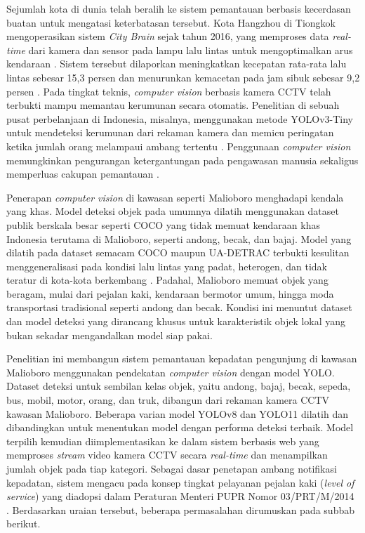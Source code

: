 Sejumlah kota di dunia telah beralih ke sistem pemantauan berbasis kecerdasan buatan 
untuk mengatasi keterbatasan tersebut. Kota Hangzhou di Tiongkok mengoperasikan sistem 
\textit{City Brain} sejak tahun 2016, yang memproses data \textit{real-time} dari kamera dan 
sensor pada lampu lalu lintas untuk mengoptimalkan arus kendaraan 
\cite{caprotti2022platform}. Sistem tersebut dilaporkan meningkatkan kecepatan rata-rata 
lalu lintas sebesar 15,3 persen dan menurunkan kemacetan pada jam sibuk sebesar 9,2 
persen \cite{caprotti2022platform}. Pada tingkat teknis, \textit{computer vision} 
berbasis kamera CCTV telah terbukti mampu memantau kerumunan secara otomatis. 
Penelitian di sebuah pusat perbelanjaan di Indonesia, misalnya, menggunakan metode 
YOLOv3-Tiny untuk mendeteksi kerumunan dari rekaman kamera dan memicu peringatan ketika 
jumlah orang melampaui ambang tertentu \cite{ginting2021crowd}. Penggunaan 
\textit{computer vision} memungkinkan pengurangan ketergantungan pada pengawasan manusia 
sekaligus memperluas cakupan pemantauan \cite{khan2020crowd}.

Penerapan \textit{computer vision} di kawasan seperti Malioboro menghadapi kendala yang 
khas. Model deteksi objek pada umumnya dilatih menggunakan dataset publik berskala besar 
seperti COCO yang tidak memuat kendaraan khas Indonesia terutama di Malioboro, seperti 
andong, becak, dan bajaj. Model yang dilatih pada dataset semacam COCO maupun UA-DETRAC 
terbukti kesulitan menggeneralisasi pada kondisi lalu lintas yang padat, heterogen, dan 
tidak teratur di kota-kota berkembang \cite{sharma2025bmd}. Padahal, Malioboro memuat 
objek yang beragam, mulai dari pejalan kaki, kendaraan bermotor umum, hingga moda 
transportasi tradisional seperti andong dan becak. Kondisi ini menuntut dataset dan model 
deteksi yang dirancang khusus untuk karakteristik objek lokal yang bukan sekadar 
mengandalkan model siap pakai.

Penelitian ini membangun sistem pemantauan kepadatan pengunjung di kawasan Malioboro 
menggunakan pendekatan \textit{computer vision} dengan model YOLO. Dataset deteksi untuk 
sembilan kelas objek, yaitu andong, bajaj, becak, sepeda, bus, mobil, motor, orang, dan 
truk, dibangun dari rekaman kamera CCTV kawasan Malioboro. Beberapa varian model 
YOLOv8 dan YOLO11 dilatih dan dibandingkan untuk menentukan model dengan performa deteksi 
terbaik. Model terpilih kemudian diimplementasikan ke dalam sistem berbasis web yang 
memproses \textit{stream} video kamera CCTV secara \textit{real-time} dan menampilkan jumlah objek 
pada tiap kategori. Sebagai dasar penetapan ambang notifikasi kepadatan, sistem mengacu 
pada konsep tingkat pelayanan pejalan kaki (\textit{level of service}) yang diadopsi 
dalam Peraturan Menteri PUPR Nomor 03/PRT/M/2014 
\cite{fruin1971designing, pupr2014pedoman}. Berdasarkan uraian tersebut, beberapa 
permasalahan dirumuskan pada subbab berikut.

